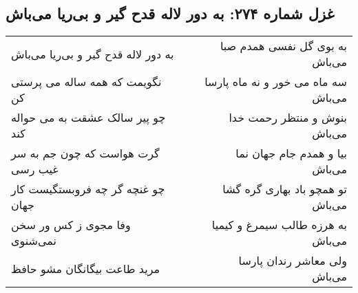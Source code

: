 \begin{center}
\section*{غزل شماره ۲۷۴: به دور لاله قدح گیر و بی‌ریا می‌باش}
\label{sec:sh274}
\begin{longtable}{l p{0.5cm} r}
به دور لاله قدح گیر و بی‌ریا می‌باش
&&
به بوی گل نفسی همدم صبا می‌باش
\\
نگویمت که همه ساله می پرستی کن
&&
سه ماه می خور و نه ماه پارسا می‌باش
\\
چو پیر سالک عشقت به می حواله کند
&&
بنوش و منتظر رحمت خدا می‌باش
\\
گرت هواست که چون جم به سر غیب رسی
&&
بیا و همدم جام جهان نما می‌باش
\\
چو غنچه گر چه فروبستگیست کار جهان
&&
تو همچو باد بهاری گره گشا می‌باش
\\
وفا مجوی ز کس ور سخن نمی‌شنوی
&&
به هرزه طالب سیمرغ و کیمیا می‌باش
\\
مرید طاعت بیگانگان مشو حافظ
&&
ولی معاشر رندان پارسا می‌باش
\\
\end{longtable}
\end{center}
